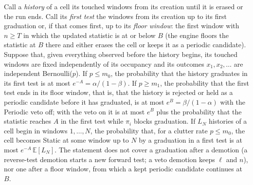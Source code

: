 \begin{proposition}\label{prop:ville}
Call a \emph{history} of a cell its touched windows from its creation until it is erased or the run ends. Call its \emph{first test} the windows from its creation up to its first graduation or, if that comes first, up to its \emph{floor window}: the first window with $n\ge T$ in which the updated statistic is at or below $B$ (the engine floors the statistic at $B$ there and either erases the cell or keeps it as a periodic candidate). Suppose that, given everything observed before the history begins, its touched windows are fixed independently of its occupancy and its outcomes $x_1,x_2,\dots$ are independent Bernoulli($p$). If $p\le m_0$, the probability that the history graduates in its first test is at most $e^{-A}=\alpha/(1-\beta)$. If $p\ge m_1$, the probability that the first test ends in its floor window, that is, that the history is rejected or held as a periodic candidate before it has graduated, is at most $e^{B}=\beta/(1-\alpha)$ with the Periodic veto off; with the veto on it is at most $e^{B}$ plus the probability that the statistic reaches $A$ in the first test while $\pi_i$ blocks graduation. If $L_N$ histories of a cell begin in windows $1,\dots,N$, the probability that, for a clutter rate $p\le m_0$, the cell becomes Static at some window up to $N$ by a graduation in a first test is at most $e^{-A}\,\mathbb{E}[L_N]$. The statement does not cover a graduation after a demotion (a reverse-test demotion starts a new forward test; a veto demotion keeps $\ell$ and $n$), nor one after a floor window, from which a kept periodic candidate continues at $B$.
\end{proposition}
